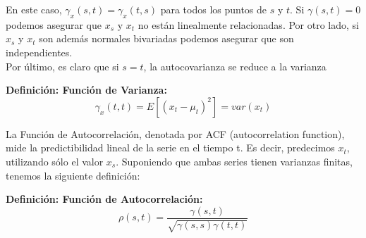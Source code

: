 En este caso, $\gamma_{x}(s,t) = \gamma_{x}(t,s)$ para todos los puntos de $s$ y $t$. Si $\gamma(s,t)=0$ podemos asegurar que $x_s$ y $x_t$ no est\'an linealmente relacionadas. Por otro lado, si $x_s$ y $x_t$  son adem\'as normales bivariadas podemos asegurar que son independientes.
\\
Por \'ultimo, es claro que si $s = t$, la autocovarianza se reduce a la varianza
\begin{definition}\label{def:def3}
	\textbf{Definici\'on: Funci\'on de Varianza:}
	\begin{equation*}
	\gamma_{x}(t,t) = E[(x_t - \mu_t)^2] = var(x_t) 
	\end{equation*} 
\end{definition} 





La Funci\'on de Autocorrelaci\'on, denotada por ACF (autocorrelation function),  mide la predictibilidad lineal de la serie en el tiempo t. Es decir, predecimos $x_t$, utilizando s\'olo el valor $x_s$. Suponiendo que ambas series tienen varianzas finitas, tenemos la siguiente definici\'on:

\vspace{5mm}

\begin{definition}\label{def:def4}
	\textbf{Definici\'on: Funci\'on de Autocorrelaci\'on:} 
	\begin{equation*}
	\rho(s,t) = \frac{\gamma(s,t)}{ \sqrt{\gamma(s,s) \gamma(t,t)}}
	\end{equation*}
\end{definition} 

